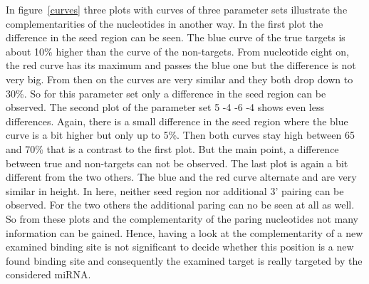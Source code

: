 \documentclass[12pt]{article}
\begin{document}
In figure~\ref{curves} three plots with curves of three parameter sets illustrate the complementarities of the nucleotides in another way. In the first plot the difference in the seed region can be seen. The blue curve of the true targets is about 10\% higher than the curve of the non-targets. From nucleotide eight on, the red curve has its maximum and passes the blue one but the difference is not very big. From then on the curves are very similar and they both drop down to 30\%. So for this parameter set only a difference in the seed region can be observed. 
The second plot of the parameter set 5 -4 -6 -4 shows even less differences. Again, there is a small difference in the seed region where the blue curve is a bit higher but only up to 5\%. Then both curves stay high between 65 and 70\% that is a contrast to the first plot. But the main point, a difference between true and non-targets can not be observed.
The last plot is again a bit different from the two others. The blue and the red curve alternate and are very similar in height. In here, neither seed region nor additional 3' pairing can be observed. For the two others the additional paring can no be seen at all as well. So from these plots and the complementarity of the paring nucleotides not many information can be gained. Hence, having a look at the complementarity of a new examined binding site is not significant to decide whether this position is a new found binding site and consequently the examined target is really targeted by the considered miRNA.\\
\end{document}
